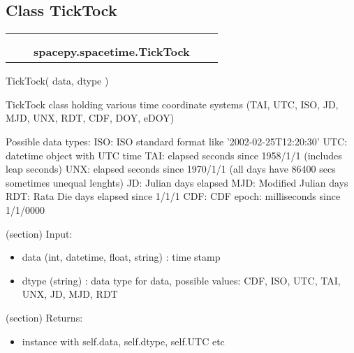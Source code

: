 

\subsection{Class TickTock}

    \label{spacepy:spacetime:TickTock}
\begin{tabular}{cccccc}
\multicolumn{2}{r}{\settowidth{\BCL}{object}\multirow{2}{\BCL}{object}}
&&
  \\\cline{3-3}
  &&\multicolumn{1}{c|}{}
&&
  \\
&&\multicolumn{2}{l}{\textbf{spacepy.spacetime.TickTock}}
\end{tabular}

TickTock( data, dtype )

TickTock class holding various time coordinate systems (TAI, UTC, ISO, JD, 
MJD, UNX, RDT, CDF, DOY, eDOY)

Possible data types: ISO: ISO standard format like '2002-02-25T12:20:30' 
UTC: datetime object with UTC time TAI: elapsed seconds since 1958/1/1 
(includes leap seconds) UNX: elapsed seconds since 1970/1/1 (all days have 
86400 secs sometimes unequal lenghts) JD: Julian days elapsed MJD: Modified
Julian days RDT: Rata Die days elapsed since 1/1/1 CDF: CDF epoch: 
milliseconds since 1/1/0000

(section) Input:

  \begin{itemize}
  \setlength{\parskip}{0.6ex}
    \item data (int, datetime, float, string) : time stamp

    \item dtype (string) : data type for data, possible values: CDF, ISO, UTC, 
      TAI, UNX, JD, MJD, RDT

  \end{itemize}

(section) Returns:

  \begin{itemize}
  \setlength{\parskip}{0.6ex}
    \item instance with self.data, self.dtype, self.UTC etc

  \end{itemize}

